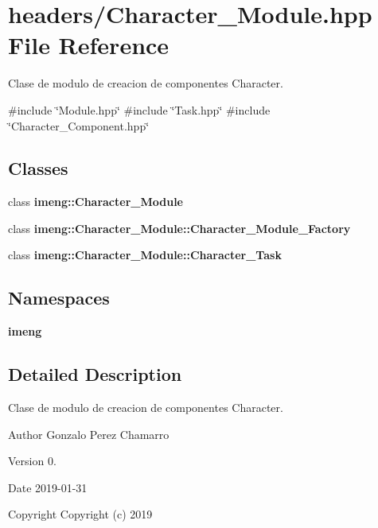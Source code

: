 \section{headers/\+Character\+\_\+\+Module.hpp File Reference}
\label{_character___module_8hpp}


Clase de modulo de creacion de componentes Character.  


{\ttfamily \#include \char`\"{}Module.\+hpp\char`\"{}}\newline
{\ttfamily \#include \char`\"{}Task.\+hpp\char`\"{}}\newline
{\ttfamily \#include \char`\"{}Character\+\_\+\+Component.\+hpp\char`\"{}}\newline
\subsection*{Classes}
\begin{DoxyCompactItemize}
\item 
class \textbf{ imeng\+::\+Character\+\_\+\+Module}
\item 
class \textbf{ imeng\+::\+Character\+\_\+\+Module\+::\+Character\+\_\+\+Module\+\_\+\+Factory}
\item 
class \textbf{ imeng\+::\+Character\+\_\+\+Module\+::\+Character\+\_\+\+Task}
\end{DoxyCompactItemize}
\subsection*{Namespaces}
\begin{DoxyCompactItemize}
\item 
 \textbf{ imeng}
\end{DoxyCompactItemize}


\subsection{Detailed Description}
Clase de modulo de creacion de componentes Character. 

\begin{DoxyAuthor}{Author}
Gonzalo Perez Chamarro 
\end{DoxyAuthor}
\begin{DoxyVersion}{Version}
0. 
\end{DoxyVersion}
\begin{DoxyDate}{Date}
2019-\/01-\/31
\end{DoxyDate}
\begin{DoxyCopyright}{Copyright}
Copyright (c) 2019 
\end{DoxyCopyright}
